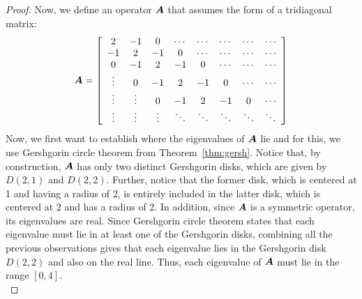 \documentclass{article}
\begin{document}
\begin{proof}
Now, we define an operator ${\bm{A}}$ that assumes the form of a tridiagonal matrix:
	\[ 
	   {\bm{A}} 
	    = 
	    \left[ 
	        \begin{array}{cccccccc}
	            2 & -1 & 0 & \cdots & \cdots & \cdots & \cdots & \cdots \\ 
	            -1 & 2 & -1 & 0 & \cdots & \cdots & \cdots & \cdots \\ 
	            0 & -1 & 2 & -1 & 0 & \cdots & \cdots & \cdots \\ 
	            \vdots & 0 & -1 & 2 & -1 & 0 & \cdots & \cdots \\ 
	            \vdots & \vdots & 0 & -1 & 2 & -1 & 0 & \cdots \\ 
	            \vdots & \vdots & \vdots & \ddots & \ddots & \ddots & \ddots & \ddots  \end{array} 
	    \right] 
    \]
Now, we first want to establish where the eigenvalues of ${\bm{A}}$ lie and for this, we use Gershgorin circle theorem from Theorem~\ref{thm:gersh}.
Notice that, by construction, ${\bm{A}}$ has only two distinct Gershgorin disks, which are given by $D\left(2, 1\right)$ and $D\left(2, 2\right)$.
Further, notice that the former disk, which is centered at 1 and having a radius of 2, is entirely included in the latter disk, which is centered at 2 and has a radius of 2.
In addition, since ${\bm{A}}$ is a symmetric operator, its eigenvalues are real.
Since Gershgorin circle theorem states that each eigenvalue must lie in at least one of the Gershgorin disks, combining all the previous observations gives that each eigenvalue lies in the Gershgorin disk $D\left(2, 2\right)$ and also on the real line.
Thus, each eigenvalue of ${\bm{A}}$ must lie in the range $[0, 4]$.\\


\end{proof}
\end{document}
